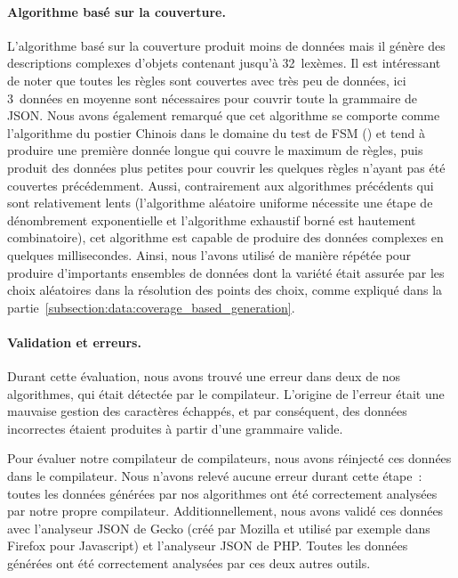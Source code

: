 \paragraph{Algorithme basé sur la couverture.} L'algorithme basé sur la
couverture produit moins de données mais il génère des descriptions complexes
d'objets contenant jusqu'à 32~lexèmes. Il est intéressant de noter que toutes
les règles sont couvertes avec très peu de données, ici 3~données en moyenne
sont nécessaires pour couvrir toute la grammaire de JSON. Nous avons également
remarqué que cet algorithme se comporte comme l'algorithme du postier Chinois
dans le domaine du test de FSM () et tend à
produire une première donnée longue qui couvre le maximum de règles, puis
produit des données plus petites pour couvrir les quelques règles n'ayant pas
été couvertes précédemment. Aussi, contrairement aux algorithmes précédents qui
sont relativement lents (l'algorithme aléatoire uniforme nécessite une étape de
dénombrement exponentielle et l'algorithme exhaustif borné est hautement
combinatoire), cet algorithme est capable de produire des données complexes en
quelques millisecondes. Ainsi, nous l'avons utilisé de manière répétée pour
produire d'importants ensembles de données dont la variété était assurée par les
choix aléatoires dans la résolution des points des choix, comme expliqué dans la
partie~\ref{subsection:data:coverage_based_generation}.

\paragraph{Validation et erreurs.} Durant cette évaluation, nous avons trouvé
une erreur dans deux de nos algorithmes, qui était détectée par le compilateur.
L'origine de l'erreur était une mauvaise gestion des caractères échappés, et par
conséquent, des données incorrectes étaient produites à partir d'une grammaire
valide.

Pour évaluer notre compilateur de compilateurs, nous avons réinjecté ces données
dans le compilateur. Nous n'avons relevé aucune erreur durant cette étape~:
toutes les données générées par nos algorithmes ont été correctement analysées
par notre propre compilateur. Additionnellement, nous avons validé ces données
avec l'analyseur JSON de Gecko (créé par Mozilla et utilisé par exemple dans
Firefox pour Javascript) et l'analyseur JSON de PHP. Toutes les données générées
ont été correctement analysées par ces deux autres outils.

